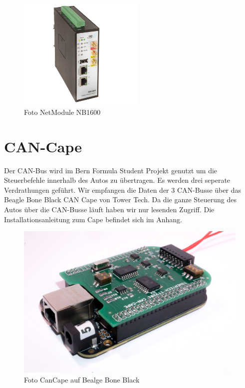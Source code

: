 \begin{figure}[hbtp]
	\center
	\includegraphics[width=6cm]{bilder/netmodule.png}
	\caption{Foto NetModule NB1600}
	\label{fig:netbox}
\end{figure}


\section{CAN-Cape}

 Der CAN-Bus wird im Bern Formula Student Projekt genutzt um die Steuerbefehle innerhalb des Autos zu übertragen. Es werden drei seperate Verdrathungen geführt. Wir empfangen die Daten der 3 CAN-Busse über das Beagle Bone Black CAN Cape von Tower Tech. Da die ganze Steuerung des Autos über die CAN-Busse läuft haben wir nur lesenden Zugriff. Die Installationsanleitung zum Cape befindet sich im Anhang.

\begin{figure}[hbtp]
	\center
	\includegraphics[width=\textwidth]{bilder/foto-4.jpg}
	\caption{Foto CanCape auf Bealge Bone Black}
	\label{fig:CanCape}
\end{figure}

